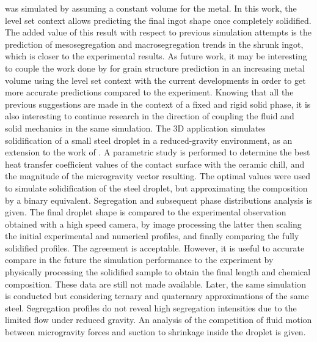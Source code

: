 was simulated by \citet{carozzani_direct_2013} assuming a constant volume for the metal. In this work, the level set context allows predicting
the final ingot shape once completely solidified. The added value of this result with respect to previous
simulation attempts is the prediction of mesosegregation and macrosegregation trends in the shrunk ingot, which is closer to the experimental results.
As future work, it may be interesting to couple the work done by \citet{chen_3d_2014} for grain structure prediction
in an increasing metal volume using the level set context with the current developments in order to get more
accurate predictions compared to the experiment. Knowing that all the previous suggestions are made in the context
of a fixed and rigid solid phase, it is also interesting to continue research in the direction of coupling the
fluid and solid mechanics in the same simulation.
\newline
\newline
The 3D application simulates solidification of a small steel droplet in a reduced-gravity environment, as
an extension to the work of \citet{rivaux_simulation_2011}. A parametric study is performed to determine
the best heat transfer coefficient values of the contact surface with the ceramic chill, and the magnitude of the microgravity vector
resulting. The optimal values were used to simulate solidification of the steel droplet, but approximating the composition by a binary equivalent.
Segregation and subsequent phase distributions analysis is given. 
The final droplet shape is compared to the experimental observation obtained with a high speed camera, by
image processing the latter then scaling the initial experimental and numerical profiles, and finally comparing the fully solidified profiles.
The agreement is acceptable. However, it is useful to accurate compare in the future the simulation performance to the experiment by
physically processing the solidified sample to obtain the final length and chemical composition. These data are still not made available.  
Later, the same simulation is conducted but considering ternary and quaternary approximations of the same steel. 
Segregation profiles do not reveal high segregation intensities due to the limited flow under
reduced gravity. An analysis of the competition of fluid motion between microgravity forces and suction to shrinkage inside the droplet is given.
